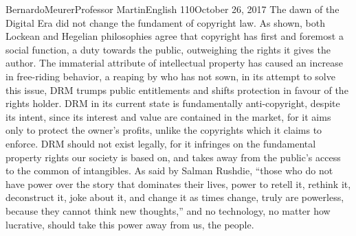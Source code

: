 \documentclass[12pt,letterpaper]{article}
\begin{document}
\begin{mla}{Bernardo}{Meurer}{Professor Martin}{English 110}{October 26, 2017}
        The dawn of the Digital Era did not change the fundament of copyright law. As shown, both Lockean and Hegelian philosophies agree that copyright has first and foremost a social function, a duty towards the public, outweighing the rights it gives the author. The immaterial attribute of intellectual property has caused an increase in free-riding behavior, a reaping by who has not sown, in its attempt to solve this issue, DRM trumps public entitlements and shifts protection in favour of the rights holder. DRM in its current state is fundamentally anti-copyright, despite its intent, since its interest and value are contained in the market, for it aims only to protect the owner's profits, unlike the copyrights which it claims to enforce. DRM should not exist legally, for it infringes on the fundamental property rights our society is based on, and takes away from the public's access to the common of intangibles. As said by Salman Rushdie, ``those who do not have power over the story that dominates their lives, power to retell it, rethink it, deconstruct it, joke about it, and change it as times change, truly are powerless, because they cannot think new thoughts,'' and no technology, no matter how lucrative, should take this power away from us, the people.
        
        \end{mla}
        
\end{document}
